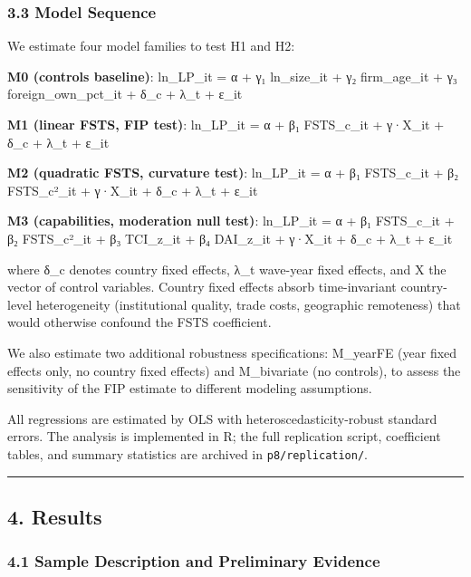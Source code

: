 \documentclass[12pt,a4paper]{article}
\begin{document}
\hypertarget{33-model-sequence}{%
\subsubsection{3.3 Model Sequence}\label{33-model-sequence}}

We estimate four model families to test H1 and H2:

\textbf{M0 (controls baseline)}: ln\_LP\_it = α + γ₁ ln\_size\_it + γ₂
firm\_age\_it + γ₃ foreign\_own\_pct\_it + δ\_c + λ\_t + ε\_it

\textbf{M1 (linear FSTS, FIP test)}: ln\_LP\_it = α + β₁ FSTS\_c\_it +
γ·X\_it + δ\_c + λ\_t + ε\_it

\textbf{M2 (quadratic FSTS, curvature test)}: ln\_LP\_it = α + β₁
FSTS\_c\_it + β₂ FSTS\_c²\_it + γ·X\_it + δ\_c + λ\_t + ε\_it

\textbf{M3 (capabilities, moderation null test)}: ln\_LP\_it = α + β₁
FSTS\_c\_it + β₂ FSTS\_c²\_it + β₃ TCI\_z\_it + β₄ DAI\_z\_it + γ·X\_it
+ δ\_c + λ\_t + ε\_it

where δ\_c denotes country fixed effects, λ\_t wave-year fixed effects,
and X the vector of control variables. Country fixed effects absorb
time-invariant country-level heterogeneity (institutional quality, trade
costs, geographic remoteness) that would otherwise confound the FSTS
coefficient.

We also estimate two additional robustness specifications: M\_yearFE
(year fixed effects only, no country fixed effects) and M\_bivariate (no
controls), to assess the sensitivity of the FIP estimate to different
modeling assumptions.

All regressions are estimated by OLS with heteroscedasticity-robust
standard errors. The analysis is implemented in R; the full replication
script, coefficient tables, and summary statistics are archived in
\texttt{p8/replication/}.

\begin{center}\rule{0.5\linewidth}{0.5pt}\end{center}

\hypertarget{4-results}{%
\subsection{4. Results}\label{4-results}}

\hypertarget{41-sample-description-and-preliminary-evidence}{%
\subsubsection{4.1 Sample Description and Preliminary
Evidence}\label{41-sample-description-and-preliminary-evidence}}
\end{document}
